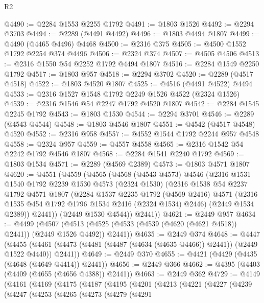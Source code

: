 \begin{lexlean}{R2}
\begin{coremodule}
@4490 := @2284 @1553 @2255 @1792
@4491 := @1803 @1526
@4492 := @2294 @3703
@4494 := @2289 (@4491 @4492)
@4496 := @1803 @4494 @1807
@4499 := @4490 (@4465 @4496) @4468
@4500 := @2316 @375
@4505 := @4500 @1552 @1792 @2254 @374 @4496
@4506 := @2324 @374
@4507 := @4505 @4506
@4513 := @2316 @1550 @54 @2252 @1792 @4494 @1807
@4516 := @2284 @1549 @2250 @1792
@4517 := @1803 @957
@4518 := @2294 @3702
@4520 := @2289 (@4517 @4518)
@4522 := @1803 @4520 @1807
@4525 := @4516 (@4491 @4522) @4494
@4533 := @2316 @1527 @1548 @1792 @2249 @1526 @4522 (@2324 @1526)
@4539 := @2316 @1546 @54 @2247 @1792 @4520 @1807
@4542 := @2284 @1545 @2245 @1792
@4543 := @1803 @1530
@4544 := @2294 @3701
@4546 := @2289 (@4543 @4544)
@4548 := @1803 @4546 @1807
@4551 := @4542 (@4517 @4548) @4520
@4552 := @2316 @958
@4557 := @4552 @1544 @1792 @2244 @957 @4548
@4558 := @2324 @957
@4559 := @4557 @4558
@4565 := @2316 @1542 @54 @2242 @1792 @4546 @1807
@4568 := @2284 @1541 @2240 @1792
@4569 := @1803 @1534
@4571 := @2289 (@4569 @2389)
@4573 := @1803 @4571 @1807
@4620 := @4551
    (@4559
      (@4565
        (@4568
          (@4543 @4573)
          @4546
          (@2316
            @1531
            @1540
            @1792
            @2239
            @1530
            @4573
            (@2324 @1530)
            (@2316
              @1538
              @54
              @2237
              @1792
              @4571
              @1807
              (@2284
                @1537
                @2235
                @1792
                (@4569 @2416)
                @4571
                (@2316 @1535 @454 @1792 @1796 @1534 @2416 (@2324 @1534) @2446)
                (@2449 @1534 @2389))
              @2441))
          (@2449 @1530 @4544))
        @2441))
@4621 := @2449 @957
@4634 := @4499
    (@4507 (@4513 (@4525 (@4533 (@4539 (@4620 (@4621 @4518)) @2441)) (@2449 @1526 @4492)) @2441))
@4635 := @2449 @374
@4648 := @4447
    (@4455 (@4461 (@4473 (@4481 (@4487 (@4634 (@4635 @4466)) @2441)) (@2449 @1522 @4440)) @2441))
@4649 := @2449 @370
@4655 := @4421 (@4429 (@4435 (@4648 (@4649 @4414)) @2441))
@4656 := @2449 @366
@4662 := @4395 (@4403 (@4409 (@4655 (@4656 @4388)) @2441))
@4663 := @2449 @362
@4729 := @4149
    (@4161
      (@4169
        (@4175
          (@4187
            (@4195
              (@4201
                (@4213
                  (@4221
                    (@4227
                      (@4239
                        (@4247
                          (@4253
                            (@4265
                              (@4273
                                (@4279
                                  (@4291

\end{coremodule}
\end{lexlean}
